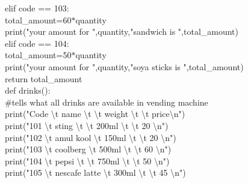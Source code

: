 \documentclass[10pt,a4paper]{article}
\begin{document}
\begin{flushleft}
\hspace*{0.5cm}    elif code == 103:\\
\hspace*{0.5cm}\hspace*{0.5cm}        total\_amount=60$\ast$quantity\\
\hspace*{0.5cm}\hspace*{0.5cm}        print("your amount for ",quantity,"sandwich is ",total\_amount)\\
\hspace*{0.5cm}    elif code == 104:\\
\hspace*{0.5cm}\hspace*{0.5cm}        total\_amount=50$\ast$quantity\\
\hspace*{0.5cm}\hspace*{0.5cm}        print("your amount for ",quantity,"soya sticks is ",total\_amount)\\ 
\hspace*{0.5cm}    return total\_amount\\
\bigskip
def drinks():\\  \#tells what all drinks are available in vending machine\\
\hspace*{0.5cm}    print("Code \textbackslash t name \textbackslash t \textbackslash t weight \textbackslash t \textbackslash t price\textbackslash n")\\
\hspace*{0.5cm}    print("101 \textbackslash t sting \textbackslash t \textbackslash t 200ml \textbackslash t \textbackslash t 20  \textbackslash n")\\
\hspace*{0.5cm}    print("102 \textbackslash t amul kool \textbackslash t 150ml \textbackslash t \textbackslash t 20 \textbackslash n")\\
\hspace*{0.5cm}    print("103 \textbackslash t coolberg \textbackslash t  500ml \textbackslash t \textbackslash t 60 \textbackslash n")\\
\hspace*{0.5cm}    print("104 \textbackslash t pepsi \textbackslash t \textbackslash t 750ml \textbackslash t \textbackslash t 50 \textbackslash n")\\
\hspace*{0.5cm}    print("105 \textbackslash t nescafe latte  \textbackslash t  300ml \textbackslash t \textbackslash t 45 \textbackslash n")\\

\end{flushleft}
\end{document}
